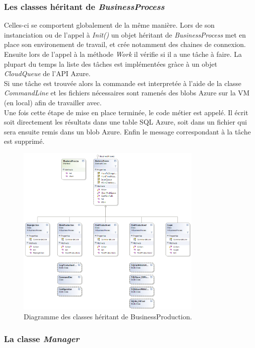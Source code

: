 \subsubsection{Les classes héritant de \textit{BusinessProcess}}
Celles-ci se comportent globalement de la même manière. Lors de son
instanciation ou de l'appel à \textit{Init()} un objet héritant de
\textit{BusinessProcess} met en place son environement de travail, et
crée notamment des chaines de connexion. Ensuite lors de l'appel à la
méthode \textit{Work} il vérifie si il a une tâche à faire. La plupart
du temps la liste des tâches est implémentées gràce à un objet
\textit{CloudQueue} de l'API Azure. \\

Si une tâche est trouvée alors la commande est interpretée à l'aide de
la classe \textit{CommandLine} et les fichiers nécessaires sont
ramenés des blobs Azure sur la VM (en local) afin de travailler avec.\\

Une fois cette étape de mise en place terminée, le code métier est
appelé. Il écrit soit directement les résultats dans une table SQL
Azure, soit dans un fichier qui sera ensuite remis dans un blob Azure.
Enfin le message correspondant à la tâche est supprimé.

\begin{figure}[h!]
  \caption{Diagramme des classes héritant de BusinessProduction.}
  \centering
    \includegraphics[width=0.8\textwidth]{images/BusinessProduction2.png}
\end{figure}
\subsubsection{La classe \textit{Manager}}

